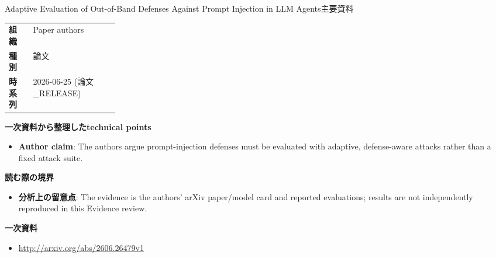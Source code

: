 \begin{technicalnote}{Adaptive Evaluation of Out-of-Band Defenses Against Prompt Injection in LLM Agents}{主要資料}
\begin{tabularx}{\linewidth}{@{}>{\bfseries}p{0.22\linewidth}X@{}}
組織 & Paper authors \\
種別 & 論文 \\
時系列 & 2026-06-25 (論文\_RELEASE) \\
\end{tabularx}
\smallskip
{\bfseries 一次資料から整理したtechnical points}
\begin{itemize}[leftmargin=1.5em,itemsep=0.35em]
\item \textbf{Author claim}: The authors argue prompt-injection defenses must be evaluated with adaptive, defense-aware attacks rather than a fixed attack suite.
\end{itemize}
{\bfseries 読む際の境界}
\begin{itemize}[leftmargin=1.5em,itemsep=0.35em]
\item \textbf{分析上の留意点}: The evidence is the authors' arXiv paper/model card and reported evaluations; results are not independently reproduced in this Evidence review.
\end{itemize}
{\bfseries 一次資料}
\begingroup\sloppy
\begin{itemize}[leftmargin=1.5em,itemsep=0.25em]
\item {\scriptsize\url{http://arxiv.org/abs/2606.26479v1}}
\end{itemize}
\endgroup
\end{technicalnote}
\medskip

